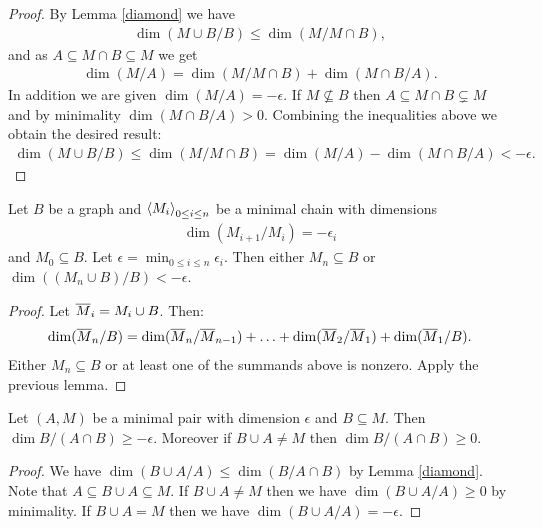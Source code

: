 \documentclass{amsart}
\begin{document}
\begin{proof}
  By Lemma \ref{diamond} we have
  \begin{align*}
    \dim(M \cup B/B) \leq \dim(M / M \cap B),
  \end{align*}
  and as $A \subseteq M \cap B \subseteq M$ we get
  \begin{align*}
    \dim (M/A) = \dim(M / M \cap B) + \dim(M \cap B / A).
  \end{align*}
  In addition we are given $\dim (M/A) = -\epsilon$.
  If $M \not\subseteq B$ then $A \subseteq M \cap B \subsetneq M$ and by minimality $\dim(M \cap B / A) > 0$.
  Combining the inequalities above we obtain the desired result:
  \begin{align*}
    \dim(M \cup B/B) \leq \dim(M / M \cap B) = \dim (M/A) - \dim(M \cap B / A) < -\epsilon.
  \end{align*}
\end{proof}

\begin{Lemma}	\label{chain_lemma}
  Let $B$ be a graph and $\left\langle M_i \right\rangle_{0 \leq i \leq n}$ be a minimal chain with dimensions
  \begin{align*}
    \dim(M_{i+1}/M_i) = -\epsilon_i
  \end{align*}
  and $M_0 \subseteq B$.
  Let $\epsilon = \min_{0 \leq i \leq n} \epsilon_i$.
  Then either $M_n \subseteq B$ or $\dim((M_n \cup B)/B) < -\epsilon$.
\end{Lemma}

\begin{proof}
  Let ${\overline{M}}_i = M_i \cup B$. Then:
  \begin{align*}
    \dim({\overline{M}}_n/B) = \dim({\overline{M}}_n/{\overline{M}}_{n-1}) + \ldots + \dim({\overline{M}}_2/{\overline{M}}_1) + \dim({\overline{M}}_1/B).
  \end{align*}
  Either $M_n \subseteq B$ or at least one of the summands above is nonzero.
  Apply the previous lemma.
\end{proof}

\begin{Lemma} \label{minimal_subset}
  Let $(A, M)$ be a minimal pair with dimension $\epsilon$ and $B \subseteq M$.
  Then $\dim B / (A \cap B) \geq -\epsilon$.
  Moreover if $B \cup A \neq M$ then $\dim B / (A \cap B) \geq 0$.
\end{Lemma}

\begin{proof}
  We have $\dim (B \cup A / A) \leq \dim (B / A \cap B)$ by Lemma \ref{diamond}.
  Note that $A \subseteq B \cup A \subseteq M$.
  If $B \cup A \neq M$ then we have $\dim (B \cup A / A) \geq 0$ by minimality.
  If $B \cup A = M$ then we have $\dim (B \cup A / A) = -\epsilon$.
\end{proof}
\end{document}
